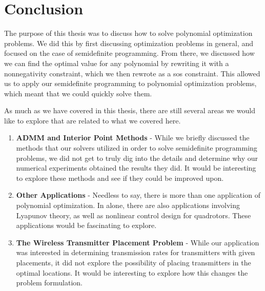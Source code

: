 
\chapter{Conclusion}

The purpose of this thesis was to discuss how to solve polynomial optimization problems. We did this by first discussing optimization problems in general, and focused on the case of semidefinite programming. From there, we discussed how we can find the optimal value for any polynomial by rewriting it with a nonnegativity constraint, which we then rewrote as a sos constraint. This allowed us to apply our semidefinite programming to polynomial optimization problems, which meant that we could quickly solve them.

As much as we have covered in this thesis, there are still several areas we would like to explore that are related to what we covered here.

\begin{enumerate}
	\item \textbf{ADMM and Interior Point Methods} - While we briefly discussed the methods that our solvers utilized in order to solve semidefinite programming problems, we did not get to truly dig into the details and determine why our numerical experiments obtained the results they did. It would be interesting to explore these methods and see if they could be improved upon. 
	
	\item \textbf{Other Applications} - Needless to say, there is more than one application of polynomial optimization. In \cite{Ahmadi2016a} alone, there are also applications involving Lyapunov theory, as well as nonlinear control design for quadrotors. These applications would be fascinating to explore. 
	
	\item \textbf{The Wireless Transmitter Placement Problem} - While our application was interested in determining transmission rates for transmitters with given placements, it did not explore the possibility of placing transmitters in the optimal locations. It would be interesting to explore how this changes the problem formulation. 
\end{enumerate}

